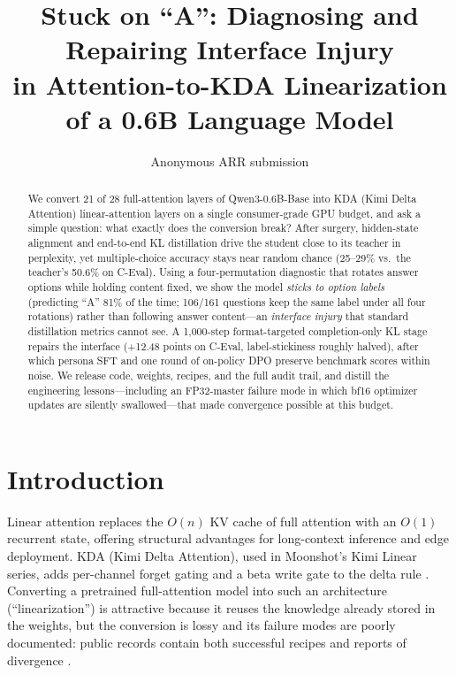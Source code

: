 \documentclass[11pt]{article}
\title{Stuck on ``A'': Diagnosing and Repairing Interface Injury\\
in Attention-to-KDA Linearization of a 0.6B Language Model}
\author{Anonymous ARR submission}
\begin{document}
\maketitle

\begin{abstract}
We convert 21 of 28 full-attention layers of Qwen3-0.6B-Base into KDA
(Kimi Delta Attention) linear-attention layers on a single consumer-grade
GPU budget, and ask a simple question: what exactly does the conversion
break? After surgery, hidden-state alignment and end-to-end KL
distillation drive the student close to its teacher in perplexity, yet
multiple-choice accuracy stays near random chance (25--29\% vs.\ the
teacher's 50.6\% on C-Eval). Using a four-permutation diagnostic that
rotates answer options while holding content fixed, we show the model
\emph{sticks to option labels} (predicting ``A'' 81\% of the time;
106/161 questions keep the same label under all four rotations) rather
than following answer content---an \emph{interface injury} that standard
distillation metrics cannot see. A 1,000-step format-targeted
completion-only KL stage repairs the interface (+12.48 points on C-Eval,
label-stickiness roughly halved), after which persona SFT and one round
of on-policy DPO preserve benchmark scores within noise. We release
code, weights, recipes, and the full audit trail, and distill the
engineering lessons---including an FP32-master failure mode in which
bf16 optimizer updates are silently swallowed---that made convergence
possible at this budget.
\end{abstract}

\section{Introduction}

Linear attention replaces the $O(n)$ KV cache of full attention with an
$O(1)$ recurrent state, offering structural advantages for long-context
inference and edge deployment. KDA (Kimi Delta Attention), used in
Moonshot's Kimi Linear series, adds per-channel forget gating and a beta
write gate to the delta rule \citep{yang2024gated,kimilinear}. Converting
a pretrained full-attention model into such an architecture
(``linearization'') is attractive because it reuses the knowledge already
stored in the weights, but the conversion is lossy and its failure modes
are poorly documented: public records contain both successful recipes
\citep{kostelec2026gendistill} and reports of divergence
\citep{chen2026halo}.
\end{document}

